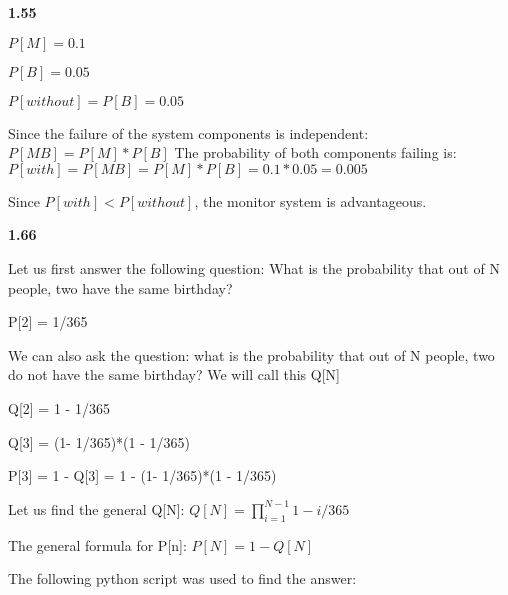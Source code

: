 \documentclass{report}
\begin{document}
\textbf{1.55}

$P[M] = 0.1$

$P[B] = 0.05$
\newline

$P[without] = P[B] = 0.05$
\newline

Since the failure of the system components is independent: \newline
$P[MB] = P[M]*P[B]$ \newline
The probability of both components failing is: \newline
$P[with] = P[MB] = P[M]*P[B] = 0.1*0.05 = 0.005$
\newline

Since $P[with] < P[without]$, the monitor system is advantageous.
\newline

\textbf{1.66}

Let us first answer the following question: \newline
What is the probability that out of N people, two have the same birthday?
\newline

P[2] = 1/365 \newline

We can also ask the question: what is the probability that out of N people,
two do not have the same birthday? We will call this Q[N]

Q[2] = 1 - 1/365

Q[3] = (1- 1/365)*(1 - 1/365)

P[3] = 1 - Q[3] = 1 - (1- 1/365)*(1 - 1/365)
\newline

Let us find the general Q[N]: \newline
$Q[N] = \prod\limits_{i=1}^{N-1} 1 - i/365$
\newline

The general formula for P[n]: \newline
$P[N] = 1 - Q[N]$
\newline

The following python script was used to find the answer:
\end{document}

